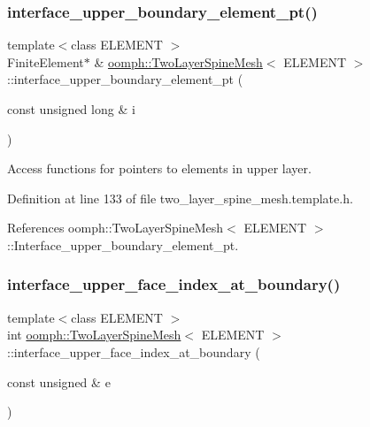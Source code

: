 \subsubsection{\texorpdfstring{interface\+\_\+upper\+\_\+boundary\+\_\+element\+\_\+pt()}{interface\_upper\_boundary\_element\_pt()}}
{\footnotesize\ttfamily template$<$class E\+L\+E\+M\+E\+NT $>$ \\
Finite\+Element$\ast$ \& \hyperlink{classoomph_1_1TwoLayerSpineMesh}{oomph\+::\+Two\+Layer\+Spine\+Mesh}$<$ E\+L\+E\+M\+E\+NT $>$\+::interface\+\_\+upper\+\_\+boundary\+\_\+element\+\_\+pt (\begin{DoxyParamCaption}\item[{const unsigned long \&}]{i }\end{DoxyParamCaption})\hspace{0.3cm}{\ttfamily [inline]}}



Access functions for pointers to elements in upper layer. 



Definition at line 133 of file two\+\_\+layer\+\_\+spine\+\_\+mesh.\+template.\+h.



References oomph\+::\+Two\+Layer\+Spine\+Mesh$<$ E\+L\+E\+M\+E\+N\+T $>$\+::\+Interface\+\_\+upper\+\_\+boundary\+\_\+element\+\_\+pt.

\mbox{\label{classoomph_1_1TwoLayerSpineMesh_a2f31c7c1ad05803e296545a0a4210164}} 
\subsubsection{\texorpdfstring{interface\+\_\+upper\+\_\+face\+\_\+index\+\_\+at\+\_\+boundary()}{interface\_upper\_face\_index\_at\_boundary()}}
{\footnotesize\ttfamily template$<$class E\+L\+E\+M\+E\+NT $>$ \\
int \hyperlink{classoomph_1_1TwoLayerSpineMesh}{oomph\+::\+Two\+Layer\+Spine\+Mesh}$<$ E\+L\+E\+M\+E\+NT $>$\+::interface\+\_\+upper\+\_\+face\+\_\+index\+\_\+at\+\_\+boundary (\begin{DoxyParamCaption}\item[{const unsigned \&}]{e }\end{DoxyParamCaption})\hspace{0.3cm}{\ttfamily [inline]}}



